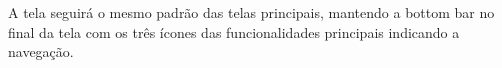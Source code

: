 A tela seguirá o mesmo padrão das telas principais, mantendo a bottom bar no final da tela com os três ícones das funcionalidades principais indicando a navegação. 

